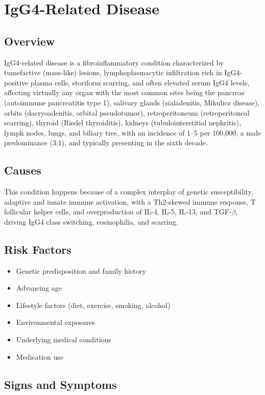\chapter{IgG4-Related Disease}
\label{sec:IgG4-Related Disease}

\section{Overview}
IgG4-related disease is a fibroinflammatory condition characterized by tumefactive (mass-like) lesions, lymphoplasmacytic infiltration rich in IgG4-positive plasma cells, storiform scarring, and often elevated serum IgG4 levels, affecting virtually any organ with the most common sites being the pancreas (autoimmune pancreatitis type 1), salivary glands (sialadenitis, Mikulicz disease), orbits (dacryoadenitis, orbital pseudotumor), retroperitoneum (retroperitoneal scarring), thyroid (Riedel thyroiditis), kidneys (tubulointerstitial nephritis), lymph nodes, lungs, and biliary tree, with an incidence of 1--5 per 100,000, a male predominance (3:1), and typically presenting in the sixth decade.
\section{Causes}
This condition happens because of a complex interplay of genetic susceptibility, adaptive and innate immune activation, with a Th2-skewed immune response, T follicular helper cells, and overproduction of IL-4, IL-5, IL-13, and TGF-$\beta$, driving IgG4 class switching, eosinophilia, and scarring.     
\section{Risk Factors}

\begin{itemize}[noitemsep]
  \item Genetic predisposition and family history
  \item Advancing age
  \item Lifestyle factors (diet, exercise, smoking, alcohol)
  \item Environmental exposures
  \item Underlying medical conditions
  \item Medication use
\end{itemize}
\section{Signs and Symptoms}

